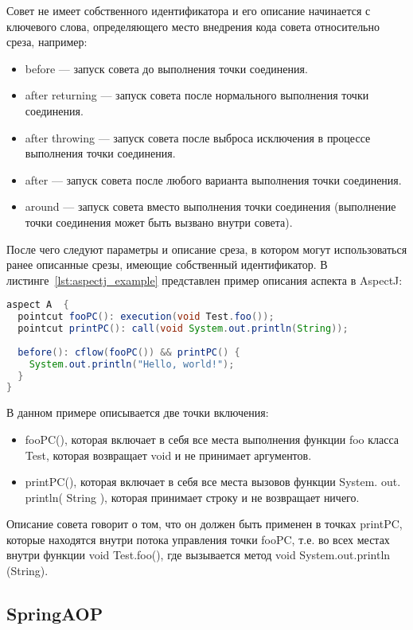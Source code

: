 Совет не имеет собственного идентификатора и его описание начинается с
ключевого слова, определяющего место внедрения кода совета относительно среза,
например:
  \begin{itemize}
    \item before --- запуск совета до выполнения точки соединения.
    \item after returning --- запуск совета после нормального выполнения 
      точки соединения.
    \item after throwing --- запуск совета после выброса исключения в 
      процессе выполнения точки соединения.
    \item after --- запуск совета после любого варианта выполнения точки 
      соединения.
    \item around --- запуск совета вместо выполнения точки соединения 
      (выполнение точки соединения может быть вызвано внутри совета).
  \end{itemize}
После чего следуют параметры и описание среза, в котором могут использоваться
ранее описанные срезы, имеющие собственный идентификатор.
В листинге~\ref{lst:aspectj_example} представлен пример описания аспекта в 
AspectJ:
  \begin{lstlisting}[language=Java, label={lst:aspectj_example}, 
  caption={Пример описания аспектов в AspectJ}]
aspect A  {
  pointcut fooPC(): execution(void Test.foo());
  pointcut printPC(): call(void System.out.println(String));
  
  before(): cflow(fooPC()) && printPC() {
    System.out.println("Hello, world!");
  }
}
  \end{lstlisting}

В данном примере описывается две точки включения:
  \begin{itemize}
    \item fooPC(), которая включает в себя все места выполнения функции foo 
      класса Test, которая возвращает void и не принимает аргументов.
    \item printPC(), которая включает в себя все места вызовов функции 
      System. out. println( String ), которая принимает строку и не 
      возвращает ничего.
  \end{itemize}
Описание совета говорит о том, что он должен быть применен в точках 
printPC, которые находятся внутри потока управления точки fooPC, т.е. во 
всех местах внутри функции void Test.foo(), где вызывается метод void 
System.out.println (String).

\subsection{SpringAOP}
\label{sub:spring_aop_overwiev}

